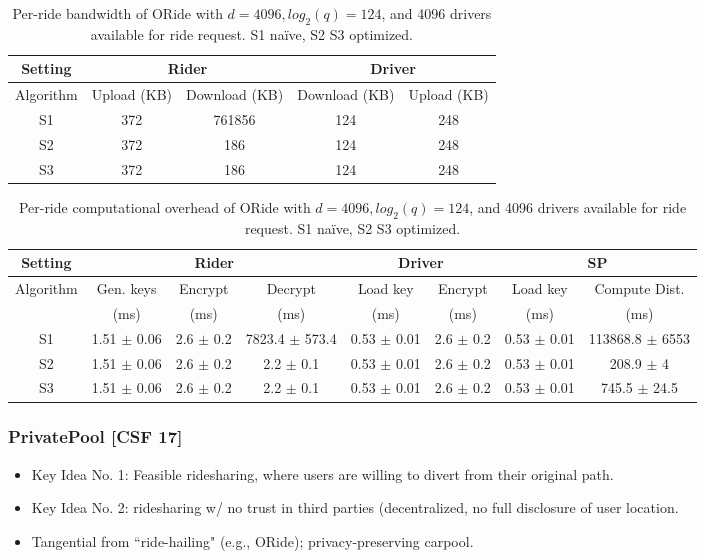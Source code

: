 \documentclass{build/llncs}
\begin{document}
\begin{table}[h]
\centering
\begin{tabular}{c|c|c|c|c}
Setting & \multicolumn{2}{c|}{Rider} & \multicolumn{2}{c}{Driver}\\ \hline
Algorithm & Upload (KB) & Download (KB) & Download (KB) & Upload (KB)\\ \hline
S1 & 372 & 761856 & 124 & 248\\ \hline
S2 & 372 & 186 & 124 & 248\\ \hline
S3 & 372 & 186 & 124 & 248\\ \hline
\end{tabular}
\caption{Per-ride bandwidth of ORide with $d=4096, log_2(q)=124$, and 4096 drivers
available for ride request. S1 na\"ive, S2 S3 optimized.}
\label{tbl:orideBW}
\end{table}
%
\begin{table*}[h]
\centering
\begin{tabular}{c|c|c|c|c|c|c|c}
Setting & \multicolumn{3}{c|}{Rider} & \multicolumn{2}{c|}{Driver} & \multicolumn{2}{c}{SP}\\ \hline
Algorithm & Gen. keys & Encrypt & Decrypt & Load key & Encrypt & Load key & Compute Dist.\\
& (ms) & (ms) & (ms) & (ms) & (ms) & (ms) & (ms)\\ \hline
S1 & 1.51 $\pm$ 0.06 & 2.6 $\pm$ 0.2 & 7823.4 $\pm$ 573.4 & 0.53 $\pm$ 0.01 & 2.6 $\pm$ 0.2 & 0.53 $\pm$ 0.01 & 113868.8 $\pm$ 6553\\ \hline
S2 & 1.51 $\pm$ 0.06 & 2.6 $\pm$ 0.2 & 2.2 $\pm$ 0.1 & 0.53 $\pm$ 0.01 & 2.6 $\pm$ 0.2 & 0.53 $\pm$ 0.01 & 208.9 $\pm$ 4\\ \hline
S3 & 1.51 $\pm$ 0.06 & 2.6 $\pm$ 0.2 & 2.2 $\pm$ 0.1 & 0.53 $\pm$ 0.01 & 2.6 $\pm$ 0.2 & 0.53 $\pm$ 0.01 & 745.5 $\pm$ 24.5\\ \hline
\end{tabular}
\caption{Per-ride computational overhead of ORide with $d=4096, log_2(q)=124$, and 4096 drivers
available for ride request. S1 na\"ive, S2 S3 optimized.}
\label{tbl:orideComput}
\end{table*}
%
\subsubsection{PrivatePool [CSF 17]}
\begin{itemize}
\item Key Idea No. 1: Feasible ridesharing, where users are willing to divert from their
original path.
\item Key Idea No. 2: ridesharing w/ no trust in third parties (decentralized,
no full disclosure of user location.
\item Tangential from ``ride-hailing" (e.g., ORide); privacy-preserving carpool.
\end{itemize}


\ifnum{}
 
 \else

\fi
\end{document}
